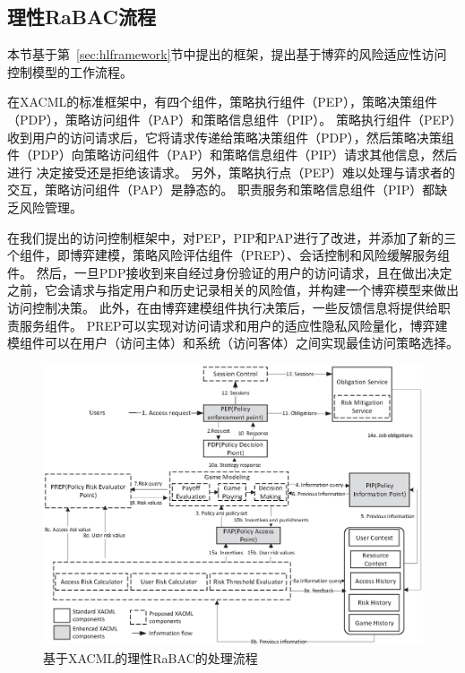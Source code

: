 \subsection{理性RaBAC流程}


本节基于第~\ref{sec:hlframework}节中提出的框架，提出基于博弈的风险适应性访问控制模型的工作流程。

在XACML的标准框架中，有四个组件，策略执行组件（PEP），策略决策组件（PDP），策略访问组件（PAP）和策略信息组件（PIP）。 策略执行组件（PEP）收到用户的访问请求后，它将请求传递给策略决策组件（PDP），然后策略决策组件（PDP）向策略访问组件（PAP）和策略信息组件（PIP）请求其他信息，然后进行 决定接受还是拒绝该请求。 另外，策略执行点（PEP）难以处理与请求者的交互，策略访问组件（PAP）是静态的。 职责服务和策略信息组件（PIP）都缺乏风险管理。


在我们提出的访问控制框架中，对PEP，PIP和PAP进行了改进，并添加了新的三个组件，即博弈建模，策略风险评估组件（PREP）、会话控制和风险缓解服务组件。 然后，一旦PDP接收到来自经过身份验证的用户的访问请求，且在做出决定之前，它会请求与指定用户和历史记录相关的风险值，并构建一个博弈模型来做出访问控制决策。 此外，在由博弈建模组件执行决策后，一些反馈信息将提供给职责服务组件。 PREP可以实现对访问请求和用户的适应性隐私风险量化，博弈建模组件可以在用户（访问主体）和系统（访问客体）之间实现最佳访问策略选择。

\begin{figure}[htb]
	\centering
	\includegraphics[width=1\textwidth]{./figures/game-rbac-workflow.eps}
	\caption{基于XACML的理性RaBAC的处理流程}\label{fig:game-rbac-workflow}
\end{figure}


